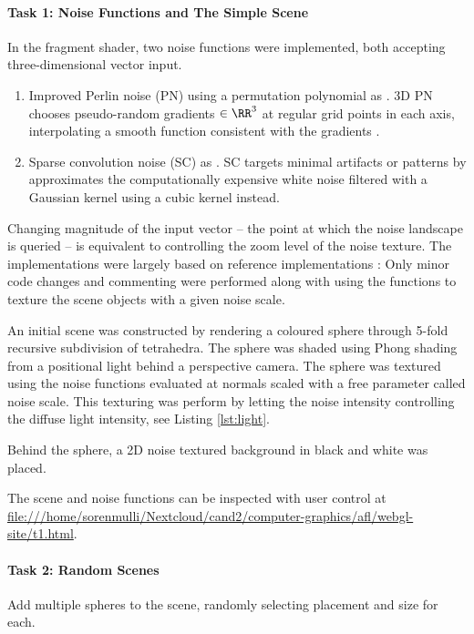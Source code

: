 \documentclass[12pt,fleqn]{article}
\begin{document}
\paragraph{Task 1: Noise Functions and The Simple Scene}
In the fragment shader, two noise functions were implemented, both accepting three-dimensional vector input.
\begin{enumerate}
    \item Improved Perlin noise (PN) using a permutation polynomial as \citeauthor{mcewan2012efficient} \cite{mcewan2012efficient}. 3D PN chooses pseudo-random gradients $\in \RR^3$ at regular grid points in each axis, interpolating a smooth function consistent with the gradients \cite{gustavson2005simplex}. 
    \item Sparse convolution noise (SC) as \citeauthor{frisvad2007fast} \cite{frisvad2007fast}. SC targets minimal artifacts or patterns by approximates the computationally expensive white noise filtered with a Gaussian kernel using a cubic kernel instead.
\end{enumerate}
Changing magnitude of the input vector -- the point at which the noise landscape is queried -- is equivalent to controlling the zoom level of the noise texture.
The implementations were largely based on reference implementations \cite{frisvad2016exploring}:
Only minor code changes and commenting were performed along with using the functions to texture the scene objects with a given noise scale.

An initial scene was constructed by rendering a coloured sphere through 5-fold recursive subdivision of tetrahedra.
The sphere was shaded using Phong shading from a positional light behind a perspective camera.
The sphere was textured using the noise functions evaluated at normals scaled with a free parameter called noise scale.
This texturing was perform by letting the noise intensity controlling the diffuse light intensity, see Listing \ref{lst:light}.

Behind the sphere, a 2D noise textured background in black and white was placed.

The scene and noise functions can be inspected with user control at \url{file:///home/sorenmulli/Nextcloud/cand2/computer-graphics/afl/webgl-site/t1.html}.


\paragraph{Task 2: Random Scenes}
Add multiple spheres to the scene, randomly selecting placement and size for each.
\end{document}
